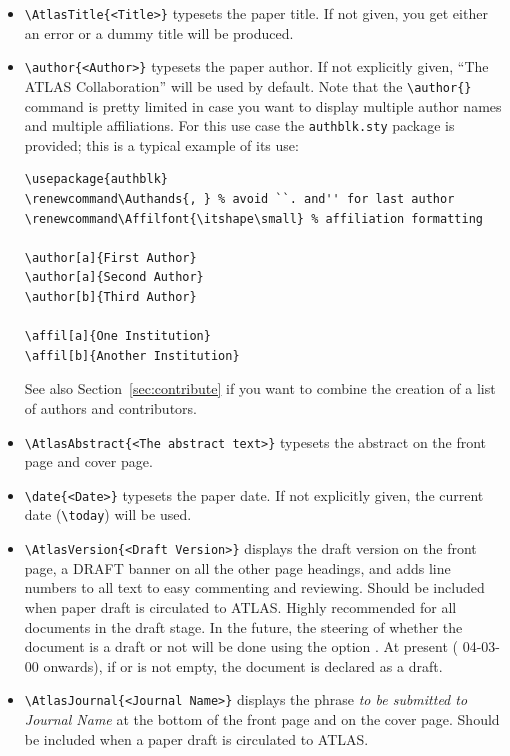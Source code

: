 \begin{itemize}
  \item {\verb|\AtlasTitle{<Title>}|} typesets the paper title. If not
    given, you get either an error or a dummy title will be produced.

  \item {\verb|\author{<Author>}|} typesets the paper author. If not
    explicitly given, \enquote{The ATLAS Collaboration} will be used by
    default. Note that the \verb|\author{}| command is pretty limited
    in case you want to display multiple author names and multiple
    affiliations. For this use case the \verb|authblk.sty| package is
    provided; this is a typical example of its use:
    \begin{verbatim}
\usepackage{authblk}
\renewcommand\Authands{, } % avoid ``. and'' for last author
\renewcommand\Affilfont{\itshape\small} % affiliation formatting

\author[a]{First Author}
\author[a]{Second Author}
\author[b]{Third Author}

\affil[a]{One Institution}
\affil[b]{Another Institution}
    \end{verbatim}
    See also Section~\ref{sec:contribute} if you want to combine the creation of a list of authors and contributors.

  \item {\verb|\AtlasAbstract{<The abstract text>}|} typesets the
    abstract on the front page and cover page.

  \item {\verb|\date{<Date>}|} typesets the paper date. If not
    explicitly given, the current date (\verb|\today|) will be used.

  \item {\verb|\AtlasVersion{<Draft Version>}|} displays the draft
    version on the front page, a DRAFT banner on all the other page
    headings, and adds line numbers to all text to easy commenting and
    reviewing.
    Should be included when paper draft is circulated to ATLAS.
    Highly recommended for all documents in the draft stage.
    In the future, the steering of whether the document is a draft or not will be done
    using the option .
    At present ( 04-03-00 onwards),
    if  or  is not empty,
    the document is declared as a draft.

  \item {\verb|\AtlasJournal{<Journal Name>}|} displays the phrase \emph{to
    be submitted to Journal Name} at the bottom of the front page and
    on the cover page.
    Should be included when a paper draft is circulated to ATLAS.


\end{itemize}

